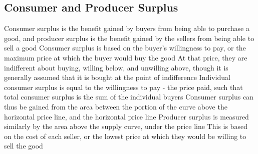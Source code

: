 \documentclass[11 pt, twoside]{article}
\newenvironment{outline*}
{
	\begin{outline}[enumerate]
	}
	{\end{outline}
}
\begin{document}
\subsection{Consumer and Producer Surplus}
\begin{outline*}
\1 Consumer surplus is the benefit gained by buyers from being able to purchase a good, and producer surplus is the benefit gained by the sellers from being able to sell a good
\1 Consumer surplus is based on the buyer's willingness to pay, or the maximum price at which the buyer would buy the good
\2 At that price, they are indifferent about buying, willing below, and unwilling above, though it is generally assumed that it is bought at the point of indifference
\2 Individual consumer surplus is equal to the willingness to pay - the price paid, such that total consumer surplus is the sum of the individual buyers
\2 Consumer surplus can thus be gained from the area between the portion of the curve above the horizontal price line, and the horizontal price line
\1 Producer surplus is measured similarly by the area above the supply curve, under the price line
\2 This is based on the cost of each seller, or the lowest price at which they would be willing to sell the good
\end{outline*}
\end{document}
